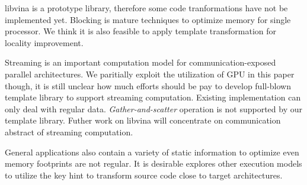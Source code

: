 \documentclass[10pt, conference, compsocconf]{IEEEtran}
\begin{document}
libvina is a prototype library, therefore some code tranformations
have not be implemented yet. Blocking is mature techniques to optimize
memory for single processor.  We think it is also feasible to apply
template  transformation for locality improvement.

Streaming is an important computation model for communication-exposed
parallel architectures. We paritially exploit the utilization of GPU in this
paper though,  it is still unclear how much efforts
should be pay to develop full-blown template library to support
streaming computation.  Existing implementation can only deal with regular
data. \emph{Gather-and-scatter} operation is not supported by our template
library. Futher work on libvina will concentrate on communication
abstract of streaming computation.

General applications also contain a variety of static information to
optimize even memory footprints are not regular. It is desirable
explores other execution models to utilize the key hint to transform
source code close to target architectures.





%
%
%
\end{document}
